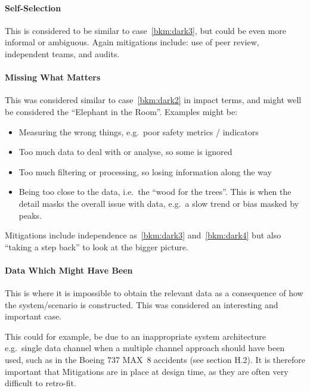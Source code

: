 \paragraph{Self-Selection}\label{bkm:dark4}
This is considered to be similar to case~\ref{bkm:dark3}, but could be even more informal or ambiguous. Again mitigations include: use of peer review, independent teams, and audits.

\paragraph{Missing What Matters}\label{bkm:dark5}
This was considered similar to case~\ref{bkm:dark2} in impact terms, and might well be considered the “Elephant in the Room”. Examples might be:
\begin{itemize}
\item Measuring the wrong things, e.g.\ poor safety metrics / indicators
  \item Too much data to deal with or analyse, so some is ignored
  \item Too much filtering or processing, so losing information along the way
  \item Being too close to the data, i.e.\ the “wood for the trees”. This is when the detail masks the overall issue with data, e.g.\ a slow trend or bias masked by peaks.
\end{itemize}

Mitigations include independence as~\ref{bkm:dark3} and~\ref{bkm:dark4} but also “taking a step back” to look at the bigger picture.

\paragraph{Data Which Might Have Been}\label{bkm:dark6}
This is where it is impossible to obtain the relevant data as a consequence of how the system/scenario is constructed. This was considered an interesting and important case.

This could for example, be due to an inappropriate system architecture e.g.\ single data channel when a multiple channel approach should have been used, such as in the Boeing 737 MAX~8 accidents (see section H.2). It is therefore important that Mitigations are in place at design time, as they are often very difficult to retro-fit.

